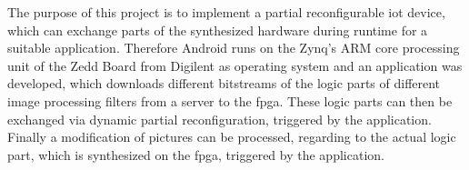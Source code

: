 The purpose of this project is to implement a partial reconfigurable \gls{iot} device, which can exchange parts of the synthesized hardware during runtime for a suitable application. Therefore Android runs on the Zynq's ARM core processing unit of the Zedd Board from Digilent as operating system and an application was developed, which downloads different bitstreams of the logic parts of different image processing filters from a server to the \gls{fpga}. These logic parts can then be exchanged via dynamic partial reconfiguration, triggered by the application. Finally a modification of pictures can be processed, regarding to the actual logic part, which is synthesized on the \gls{fpga}, triggered by the application.